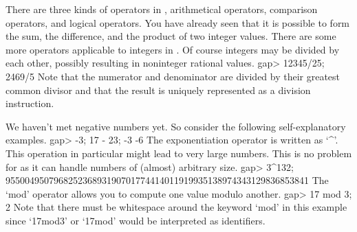 There are  three kinds  of operators in  {\GAP}, arithmetical  operators,
comparison operators, and logical operators.  You  have already seen that
it is possible to form  the sum,  the  difference, and the product of two
integer values.  There are some  more operators applicable to integers in
{\GAP}.   Of  course integers  may  be divided  by  each other,  possibly
resulting in noninteger rational values.
\beginexample
    gap> 12345/25;
    2469/5 
\endexample
Note  that  the numerator and denominator  are divided by their  greatest
common divisor  and that the result is uniquely represented as a division
instruction.

We     haven't met negative numbers      yet.  So consider the  following
self-explanatory examples.
\beginexample
    gap> -3; 17 - 23;
    -3
    -6 
\endexample
The exponentiation   operator  is  written  as  `^'. This   operation  in
particular might lead  to  very large numbers.  This  is  no problem  for
{\GAP} as it can handle numbers of (almost) arbitrary size.
\beginexample
    gap> 3^132;
    955004950796825236893190701774414011919935138974343129836853841 
\endexample
The `mod' operator allows you to compute one value modulo another.
\beginexample
    gap> 17 mod 3;
    2 
\endexample
Note  that  there must be   whitespace around the  keyword  `mod' in this
example since `17mod3' or `17mod' would be interpreted as identifiers.

